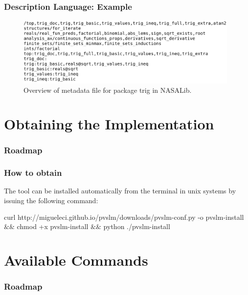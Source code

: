 \documentclass[mathserif,fleqn]{beamer}
\begin{document}
\begin{frame}
  \frametitle{Description Language: Example}
  \begin{figure}
   \centering
   \includegraphics[width=11cm]{top.png}
   \caption{Overview of metadata file for package trig in NASALib.}
  \end{figure}

\end{frame}

\section{Obtaining the  Implementation}

\begin{frame}
  \frametitle{Roadmap} 
  \tableofcontents[currentsection]
\end{frame}

\begin{frame}
   \frametitle{How to obtain }

   The  tool can be installed automatically from the terminal in
   unix systems by issuing the following command: 
   
   \bigskip
   
   \begin{small}
   \begin{tt}
     curl http://migueleci.github.io/pvslm/downloads/pvslm-conf.py 
      -o pvslm-install $\&\&$ chmod +x pvslm-install $\&\&$ 
      python ./pvslm-install
   \end{tt}
   \end{small}

\end{frame}

\section{Available Commands}

\begin{frame}
  \frametitle{Roadmap} 
  \tableofcontents[currentsection]
\end{frame}
\end{document}
